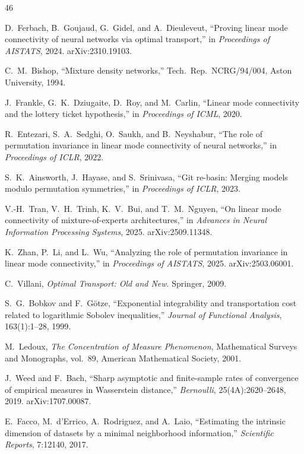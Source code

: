 \documentclass[11pt]{article}
\begin{document}
\begin{thebibliography}{46}

D.~Ferbach, B.~Goujaud, G.~Gidel, and A.~Dieuleveut,
``Proving linear mode connectivity of neural networks via optimal
transport,'' in \emph{Proceedings of AISTATS}, 2024.
arXiv:2310.19103.

C.~M.~Bishop,
``Mixture density networks,''
Tech.\ Rep.\ NCRG/94/004, Aston University, 1994.

J.~Frankle, G.~K.~Dziugaite, D.~Roy, and M.~Carlin,
``Linear mode connectivity and the lottery ticket hypothesis,''
in \emph{Proceedings of ICML}, 2020.

R.~Entezari, S.~A.~Sedghi, O.~Saukh, and B.~Neyshabur,
``The role of permutation invariance in linear mode connectivity of
neural networks,'' in \emph{Proceedings of ICLR}, 2022.

S.~K.~Ainsworth, J.~Hayase, and S.~Srinivasa,
``Git re-basin: Merging models modulo permutation symmetries,''
in \emph{Proceedings of ICLR}, 2023.

V.-H.~Tran, V.~H.~Trinh, K.~V.~Bui, and T.~M.~Nguyen,
``On linear mode connectivity of mixture-of-experts architectures,''
in \emph{Advances in Neural Information Processing Systems}, 2025.
arXiv:2509.11348.

K.~Zhan, P.~Li, and L.~Wu,
``Analyzing the role of permutation invariance in linear mode
connectivity,'' in \emph{Proceedings of AISTATS}, 2025.
arXiv:2503.06001.

C.~Villani,
\emph{Optimal Transport: Old and New}.
Springer, 2009.

S.~G.~Bobkov and F.~G\"otze,
``Exponential integrability and transportation cost related to
logarithmic Sobolev inequalities,''
\emph{Journal of Functional Analysis}, 163(1):1--28, 1999.

M.~Ledoux,
\emph{The Concentration of Measure Phenomenon},
Mathematical Surveys and Monographs, vol.~89,
American Mathematical Society, 2001.

J.~Weed and F.~Bach,
``Sharp asymptotic and finite-sample rates of convergence of empirical
measures in Wasserstein distance,''
\emph{Bernoulli}, 25(4A):2620--2648, 2019.
arXiv:1707.00087.

E.~Facco, M.~d'Errico, A.~Rodriguez, and A.~Laio,
``Estimating the intrinsic dimension of datasets by a minimal neighborhood
information,'' \emph{Scientific Reports}, 7:12140, 2017.


\end{thebibliography}
\end{document}
